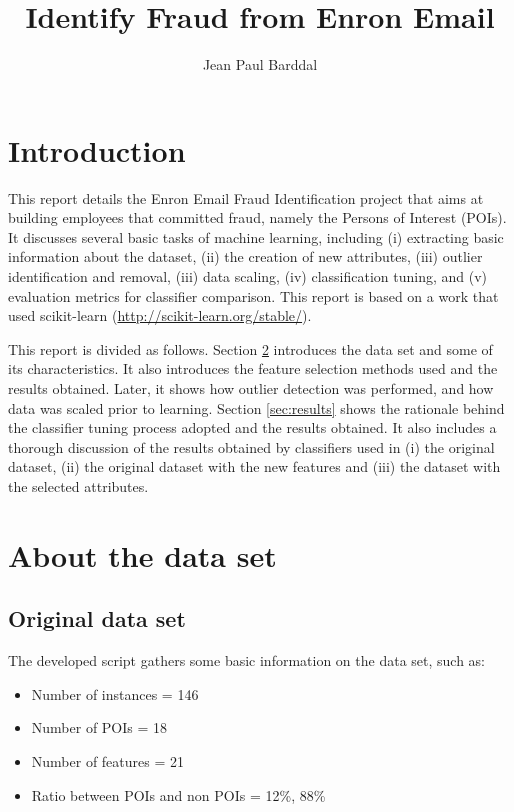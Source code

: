 \documentclass[11pt]{article}
\begin{document}
\title{Identify Fraud from Enron Email}
\author{Jean Paul Barddal}
\maketitle

\section{Introduction}

	This report details the Enron Email Fraud Identification project that aims at building employees that committed fraud, namely the Persons of Interest (POIs).
	It discusses several basic tasks of machine learning, including (i) extracting basic information about the dataset, (ii) the creation of new attributes, (iii) outlier identification and removal, (iii) data scaling, (iv) classification tuning, and (v) evaluation metrics for classifier comparison.
	This report is based on a work that used scikit-learn (\url{http://scikit-learn.org/stable/}).

	This report is divided as follows.
	Section \ref{sec:about} introduces the data set and some of its characteristics.
	It also introduces the feature selection methods used and the results obtained.
	Later, it shows how outlier detection was performed, and how data was scaled prior to learning.	
	Section \ref{sec:results} shows the rationale behind the classifier tuning process adopted and the results obtained.
	It also includes a thorough discussion of the results obtained by classifiers used in (i) the original dataset, (ii) the original dataset with the new features and (iii) the dataset with the selected attributes.
	
	
\section{About the data set} \label{sec:about}

	\subsection{Original data set}
	
		The developed script gathers some basic information on the data set, such as:
		\begin{itemize}
			\item Number of instances = 146
			\item Number of POIs = 18
			\item Number of features = 21
			\item Ratio between POIs and non POIs = 12\%, 88\%
		\end{itemize}
		
\end{document}
